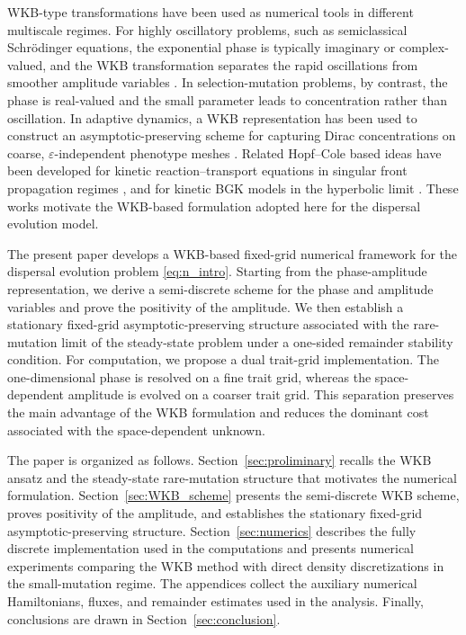 \documentclass[11pt]{article}
\numberwithin{equation}{section}
\begin{document}
WKB-type transformations have been used as numerical tools in different multiscale regimes. For highly oscillatory problems, such as semiclassical Schr\"odinger equations, the exponential phase is typically imaginary or complex-valued, and the WKB transformation separates the rapid oscillations from smoother amplitude variables \cite{ArnoldAbdallahNegulescu2011,KoernerArnoldDoepfner2022}. In selection-mutation problems, by contrast, the phase is real-valued and the small parameter leads to concentration rather than oscillation. In adaptive dynamics, a WKB representation has been used to construct an asymptotic-preserving scheme for capturing Dirac concentrations on coarse, \(\varepsilon\)-independent phenotype meshes \cite{AlmeidaPerthameRuan}. Related Hopf--Cole based  ideas have been developed for kinetic reaction--transport equations in singular front propagation regimes \cite{Hivert2018}, and for kinetic BGK models in the hyperbolic limit \cite{LuoPayne2017}. These works motivate the WKB-based formulation adopted here for the dispersal evolution model.






The present paper develops a WKB-based fixed-grid numerical framework for the
dispersal evolution problem \eqref{eq:n_intro}.  Starting from the
phase-amplitude representation, we derive a semi-discrete scheme for the phase
and amplitude variables and prove the positivity of the amplitude.  We then
establish a stationary fixed-grid asymptotic-preserving structure associated with the
rare-mutation limit of the steady-state problem under a one-sided remainder
stability condition.  For computation, we propose a dual trait-grid
implementation.  The one-dimensional phase is resolved on a fine trait grid,
whereas the space-dependent amplitude is evolved on a coarser trait grid.  This
separation preserves the main advantage of the WKB formulation and reduces the
dominant cost associated with the space-dependent unknown.





The paper is organized as follows.  Section~\ref{sec:proliminary} recalls the WKB ansatz and the
steady-state rare-mutation structure that motivates the numerical formulation.
Section~\ref{sec:WKB_scheme} presents the semi-discrete WKB scheme, proves positivity of the
amplitude, and establishes the stationary fixed-grid asymptotic-preserving structure.  Section~\ref{sec:numerics}
describes the fully discrete implementation used in the computations and
presents numerical experiments comparing the WKB method with direct density
discretizations in the small-mutation regime.  The appendices collect the
auxiliary numerical Hamiltonians, fluxes, and remainder estimates used in the
analysis.  
Finally, conclusions are drawn in Section~\ref{sec:conclusion}.
\end{document}
